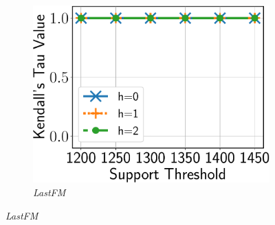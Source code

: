 \begin{figure}
\begin{subfigure}[b]{0.25\textwidth}
		\includegraphics[keepaspectratio,scale=0.24, angle=0]{img2/lastfm/lastfm_kt.pdf}
		\caption{{\em LastFM}}
		\label{fig:lastfm_kt}
	\end{subfigure}%

\end{figure}
